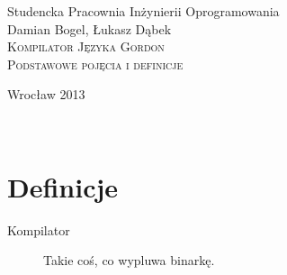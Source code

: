 \documentclass[12pt]{article}
\begin{document}
\begin{titlepage}
\begin{center}
Studencka Pracownia Inżynierii Oprogramowania\\[3.5cm]

Damian Bogel, Łukasz Dąbek\\[1cm]
\textsc{\LARGE Kompilator Języka Gordon}\\[1cm]
\textsc{\large Podstawowe pojęcia i definicje}

\vfill
Wrocław 2013

\end{center}
\end{titlepage}

\newpage
\setcounter{page}{2}
~
\newpage

\section{Definicje}
\begin{description}
    \item[Kompilator] Takie coś, co wypluwa binarkę.
\end{description}
\end{document}
